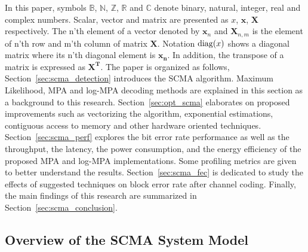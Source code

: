In this paper, symbols $\mathbb{B}$, $\mathbb{N}$, $\mathbb{Z}$, $\mathbb{R}$
and $\mathbb{C}$ denote binary, natural, integer, real and complex numbers.
Scalar, vector and matrix are presented as $x$, $\bm{x}$, $\bm{X}$ respectively.
The n'th element of a vector denoted by $\bm{x}_n$ and $\bm{X}_{n,m}$ is the
element of n'th row and m'th column of matrix $\bm{X}$. Notation $\operatorname{diag}(x)$
shows a diagonal matrix where its n'th diagonal element is $\bm{x_n}$. In
addition, the transpose of a matrix is expressed as $\bm{X^T}$. The paper is
organized as follows, Section~\ref{sec:scma_detection} introduces the SCMA
algorithm. Maximum Likelihood, MPA and log-MPA decoding methods are explained in
this section as a background to this research.
Section~\ref{sec:opt_scma} elaborates on proposed improvements such as
vectorizing the algorithm, exponential estimations, contiguous access to memory
and other hardware oriented techniques. Section~\ref{sec:scma_perf} explores the
bit error rate performance as well as the throughput, the latency, the power
consumption, and the energy efficiency of the proposed MPA and log-MPA
implementations. Some profiling metrics are given to better understand the
results. Section~\ref{sec:scma_fec} is dedicated to study the effects of
suggested techniques on block error rate after channel coding. Finally, the main
findings of this research are summarized in Section~\ref{sec:scma_conclusion}.

\subsection{Overview of the SCMA System Model}
\label{sec:scma_overview}


